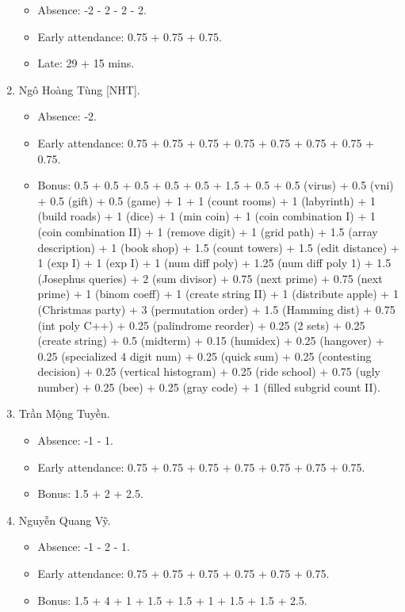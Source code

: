 \documentclass{article}
\begin{document}
\begin{enumerate}
\begin{itemize}
		\item Absence: -2 - 2 - 2 - 2.
		\item Early attendance: 0.75 + 0.75 + 0.75.
		\item Late: 29 + 15 mins.
	\end{itemize}
	\item {\sc Ngô Hoàng Tùng [NHT].}
	\begin{itemize}
        \item Absence: -2.
		\item Early attendance: 0.75 + 0.75 + 0.75 + 0.75 + 0.75 + 0.75 + 0.75 + 0.75.
		\item Bonus: 0.5 + 0.5 + 0.5 + 0.5 + 0.5 + 1.5 + 0.5 + 0.5 (virus) + 0.5 (vni) + 0.5 (gift) + 0.5 (game) + 1 + 1 (count rooms) + 1 (labyrinth) + 1 (build roads) + 1 (dice) + 1 (min coin) + 1 (coin combination I) + 1 (coin combination II) + 1 (remove digit) + 1 (grid path) + 1.5 (array description) + 1 (book shop) + 1.5 (count towers) + 1.5 (edit distance) + 1 (exp I) + 1 (exp I) + 1 (num diff poly) + 1.25 (num diff poly 1) + 1.5 (Josephus queries) + 2 (sum divisor) + 0.75 (next prime) + 0.75 (next prime) + 1 (binom coeff) + 1 (create string II) + 1 (distribute apple) + 1 (Christmas party) + 3 (permutation order) + 1.5 (Hamming dist) + 0.75 (int poly C++) + 0.25 (palindrome reorder) + 0.25 (2 sets) + 0.25 (create string) + 0.5 (midterm) + 0.15 (humidex) + 0.25 (hangover) + 0.25 (specialized 4 digit num) + 0.25 (quick sum)  + 0.25 (contesting decision) + 0.25 (vertical histogram) + 0.25 (ride school) + 0.75 (ugly number) + 0.25 (bee) + 0.25 (gray code) + 1 (filled subgrid count II).
	\end{itemize}
	\item {\sc Trần Mộng Tuyền.}
	\begin{itemize}
		\item Absence: -1 - 1.
		\item Early attendance: 0.75 + 0.75 + 0.75 + 0.75 + 0.75 + 0.75 + 0.75.
        \item Bonus: 1.5 + 2 + 2.5.
	\end{itemize}
	\item {\sc Nguyễn Quang Vỹ.}
	\begin{itemize}
		\item Absence: -1 - 2 - 1.
		\item Early attendance: 0.75 + 0.75 + 0.75 + 0.75 + 0.75 + 0.75.
		\item Bonus: 1.5 + 4 + 1 + 1.5 + 1.5 + 1 + 1.5 + 1.5 + 2.5.
	\end{itemize}
\end{enumerate}
\end{document}
